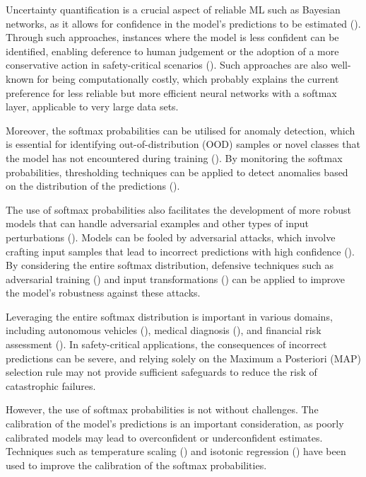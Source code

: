 Uncertainty quantification is a crucial aspect of reliable ML such as Bayesian networks, as it allows for confidence in the model's predictions to be estimated (\cite{kendall2017uncertainties}). Through such approaches, instances where the model is less confident can be identified, enabling deference to human judgement or the adoption of a more conservative action in safety-critical scenarios (\cite{michelmore2018evaluating}). Such approaches are also well-known for being computationally costly, which probably explains the current preference for less reliable but more efficient neural networks with a softmax layer, applicable to very large data sets. 

Moreover, the softmax probabilities can be utilised for anomaly detection, which is essential for identifying out-of-distribution (OOD) samples or novel classes that the model has not encountered during training (\cite{hendrycks17baseline}). By monitoring the softmax probabilities, thresholding techniques can be applied to detect anomalies based on the distribution of the predictions (\cite{liang2018enhancing}).

The use of softmax probabilities also facilitates the development of more robust models that can handle adversarial examples and other types of input perturbations (\cite{goodfellow2014explaining}). Models can be fooled by adversarial attacks, which involve crafting input samples that lead to incorrect predictions with high confidence (\cite{szegedy2013intriguing}). By considering the entire softmax distribution, defensive techniques such as adversarial training (\cite{madry2017towards}) and input transformations (\cite{guo2018countering}) can be applied to improve the model's robustness against these attacks.

Leveraging the entire softmax distribution is important in various domains, including autonomous vehicles (\cite{michelmore2018evaluating}), medical diagnosis (\cite{leibig2017leveraging}), and financial risk assessment (\cite{feng2018deep}). In safety-critical applications, the consequences of incorrect predictions can be severe, and relying solely on the Maximum a Posteriori (MAP) selection rule may not provide sufficient safeguards to reduce the risk of catastrophic failures.

However, the use of softmax probabilities is not without challenges. The calibration of the model's predictions is an important consideration, as poorly calibrated models may lead to overconfident or underconfident estimates. Techniques such as temperature scaling (\cite{guo2017calibration}) and isotonic regression (\cite{zadrozny2002transforming}) have been used to improve the calibration of the softmax probabilities. 

